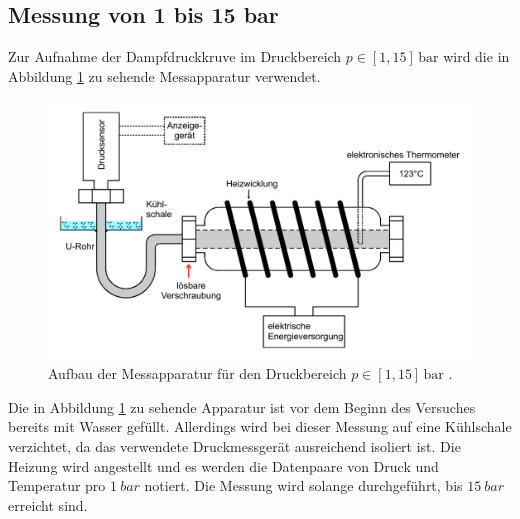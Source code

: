 \subsection{Messung von 1 bis 15 bar}

Zur Aufnahme der Dampfdruckkruve im Druckbereich $p \in [1, 15] \, \mathrm{bar}$ wird die 
in Abbildung \ref{fig:hochdruck} zu sehende Messapparatur verwendet. 
\begin{figure} [H]
    \centering
    \includegraphics[width=12cm] {pictures/hochdruck.pdf} 
    \caption{Aufbau der Messapparatur für den Druckbereich $p \in [1, 15] \, \mathrm{bar}$ \cite[8]{v203}.}
    \label{fig:hochdruck}
\end{figure} 

Die in Abbildung \ref{fig:hochdruck} zu sehende Apparatur ist vor dem Beginn des Versuches bereits mit Wasser gefüllt. 
Allerdings wird bei dieser Messung auf eine Kühlschale verzichtet, da das verwendete Druckmessgerät ausreichend isoliert ist.
Die Heizung wird angestellt und es werden die Datenpaare von Druck und Temperatur pro $\qty{1}{bar}$ notiert. 
Die Messung wird solange durchgeführt, bis $\qty{15}{bar}$ erreicht sind.